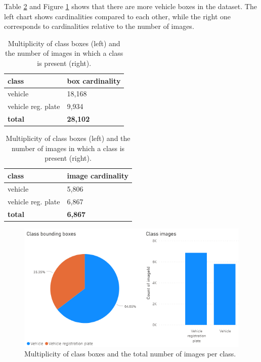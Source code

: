 Table \ref{tab:class_multiplicity} and Figure \ref{fig:class_multiplicity} shows that there are more vehicle boxes in the dataset. The left chart shows cardinalities compared to each other, while the right one corresponds to cardinalities relative to the number of images.

\begin{table}[H]
 \caption{Multiplicity of class boxes (left) and the number of images in which a class is present (right).}
 \label{tab:class_multiplicity}
\begin{minipage}{.5\linewidth}
 \centering
\begin{tabular}{ll}
    class & box cardinality\\ \hline
    vehicle & 18,168 \\
    vehicle reg. plate & 9,934 \\
    \textbf{total} & \textbf{28,102} \\
\end{tabular}
\end{minipage}%
\begin{minipage}{.5\linewidth}
 \centering
\begin{tabular}{ll}
    class & image cardinality\\ \hline
    vehicle & 5,806 \\
    vehicle reg. plate & 6,867 \\
    \textbf{total} & \textbf{6,867} \\
\end{tabular}
\end{minipage} 
\end{table}

\begin{figure}[H]
 \centerline{\includegraphics[width=1.0\columnwidth]{.//Figure/PlateLocalization/class_multiplicity.png}}
 \caption{Multiplicity of class boxes and the total number of images per class.}
 \label{fig:class_multiplicity}
\end{figure}

